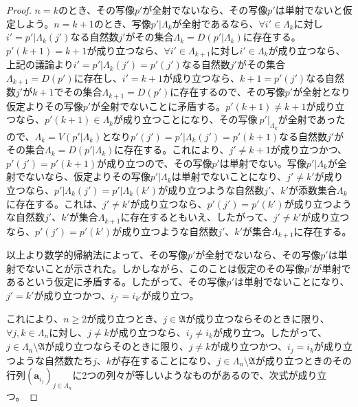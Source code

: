 \documentclass[dvipdfmx]{jsarticle}
\begin{document}
\begin{proof}
$n = k$のとき、その写像$p'$が全射でないなら、その写像$p'$は単射でないと仮定しよう。$n = k + 1$のとき、写像$p'|\varLambda_{k}$が全射であるなら、$\forall i' \in \varLambda_{k}$に対し$i' = p'|\varLambda_{k}\left( j' \right)$なる自然数$j'$がその集合$\varLambda_{k} = D\left( p'|\varLambda_{k} \right)$に存在する。$p'(k + 1) = k + 1$が成り立つなら、$\forall i' \in \varLambda_{k + 1}$に対し$i' \in \varLambda_{k}$が成り立つなら、上記の議論より$i' = p'|\varLambda_{k}\left( j' \right) = p'\left( j' \right)$なる自然数$j'$がその集合$\varLambda_{k + 1} = D\left( p' \right)$に存在し、$i' = k + 1$が成り立つなら、$k + 1 = p'\left( j' \right)$なる自然数$j'$が$k + 1$でその集合$\varLambda_{k + 1} = D\left( p' \right)$に存在するので、その写像$p'$が全射となり仮定よりその写像$p'$が全射でないことに矛盾する。$p'(k + 1) \neq k + 1$が成り立つなら、$p'(k + 1) \in \varLambda_{k}$が成り立つことになり、その写像$\left. \ p' \right|_{\varLambda_{k}}$が全射であったので、$\varLambda_{k} = V\left( p'|\varLambda_{k} \right)$となり$p'\left( j' \right) = p'|\varLambda_{k}\left( j' \right) = p'(k + 1)$なる自然数$j'$がその集合$\varLambda_{k} = D\left( p'|\varLambda_{k} \right)$に存在する。これにより、$j' \neq k + 1$が成り立つかつ、$p'\left( j' \right) = p'(k + 1)$が成り立つので、その写像$p'$は単射でない。写像$p'|\varLambda_{k}$が全射でないなら、仮定よりその写像$p'|\varLambda_{k}$は単射でないことになり、$j' \neq k'$が成り立つなら、$p'|\varLambda_{k}\left( j' \right) = p'|\varLambda_{k}\left( k' \right)$が成り立つような自然数$j'$、$k'$が添数集合$\varLambda_{k}$に存在する。これは、$j' \neq k'$が成り立つなら、$p'\left( j' \right) = p'\left( k' \right)$が成り立つような自然数$j'$、$k'$が集合$\varLambda_{k + 1}$に存在するともいえ、したがって、$j' \neq k'$が成り立つなら、$p'\left( j' \right) = p'\left( k' \right)$が成り立つような自然数$j'$、$k'$が集合$\varLambda_{k + 1}$に存在する。\par
以上より数学的帰納法によって、その写像$p'$が全射でないなら、その写像$p'$は単射でないことが示された。しかしながら、このことは仮定のその写像$p'$が単射であるという仮定に矛盾する。したがって、その写像$p'$は単射でないことになり、$j' = k'$が成り立つかつ、$i_{j'} = i_{k'}$が成り立つ。\par
これにより、$n \geq 2$が成り立つとき、$j \in \mathfrak{A}$が成り立つならそのときに限り、$\forall j,k \in \varLambda_{n}$に対し、$j \neq k$が成り立つなら、$i_{j} \neq i_{k}$が成り立つ。したがって、$j \in \varLambda_{n}\mathfrak{\setminus A}$が成り立つならそのときに限り、$j \neq k$が成り立つかつ、$i_{j} = i_{k}$が成り立つような自然数たち$j$、$k$が存在することになり、$j \in \varLambda_{n}\mathfrak{\setminus A}$が成り立つときのその行列$\left( \mathbf{a}_{i_{j}} \right)_{j \in \varLambda_{n}}$に2つの列々が等しいようなものがあるので、次式が成り立つ。

\end{proof}
\end{document}
